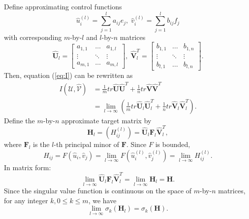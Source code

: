 \documentclass[12pt,onecolumn,draftcls]{IEEEtran}
\begin{document}
Define approximating control functions
\begin{equation}
\hat{u}_i^{(l)}=\sum_{j=1}^l a_{ij}e_j, \; \hat{v}_i^{(l)}=\sum_{j=1}^l b_{ij}f_j
\end{equation}
with corresponding $m$-by-$l$ and $l$-by-$n$ matrices
\begin{equation}
\mathbf{\hat{U}}_l=
\left[ 
\begin{array}{lll}
a_{1,1} & \ldots & a_{1,l} \\
\vdots & \ddots & \vdots \\
a_{m,1} & \ldots  & a_{m,l}
\end{array}
\right], \;
\mathbf{\hat{V}}_l^T=
\left[
\begin{array}{lll}
b_{1,1} & \ldots & b_{1,n} \\
\vdots & \ddots & \vdots \\
b_{l,1} & \ldots  & b_{l,n}
\end{array}
\right].
\end{equation}
Then, equation (\ref{eq:I}) can be rewritten as
\begin{align}
I(\mathcal{\hat{U}},\mathcal{\hat{V}})&= \frac{1}{m} tr \mathbf{\hat{U}} \mathbf{\hat{U}}^T +
\frac{1}{n}tr \mathbf{\hat{V}} \mathbf{\hat{V}}^T\\
&=
\lim_{l\rightarrow \infty} \left(
\frac{1}{m} tr \mathbf{\hat{U}}_l \mathbf{\hat{U}}_l^T +
\frac{1}{n} tr \mathbf{\hat{V}}_l \mathbf{\hat{V}}_l^T \right).
\end{align}
Define the $m$-by-$n$ approximate target matrix by
\begin{equation}
\mathbf{H}_l=\left( H_{ij}^{(l)} \right) = \mathbf{\hat{U}}_l \mathbf{F}_l \mathbf{\hat{V}}_l^T,
\end{equation}
where $\mathbf{F}_l$ is the $l$-th principal minor of $\mathbf{F}$.  Since $F$ is bounded, 
\begin{equation}
H_{ij}=F( \hat{u}_i, \hat{v}_j)=\lim_{l \rightarrow \infty} F(\hat{u}_i^{(l)},\hat{v}_j^{(l)})
=\lim_{l \rightarrow \infty}  H_{ij}^{(l)}.
\end{equation}
In matrix form:
\begin{equation}
\lim_{l \rightarrow \infty}  \mathbf{\hat{U}}_l \mathbf{F}_l \mathbf{\hat{V}}_l^T
=\lim_{l \rightarrow \infty} \mathbf{H}_l
=\mathbf{H}.
\label{eq:Hlimit}
\end{equation}
Since the singular value function is continuous on the space of $m$-by-$n$ matrices, for any integer $k, 0 \leq k \leq m$,
we have
\begin{equation}
\lim_{l \rightarrow \infty} \sigma_k(\mathbf{H}_l)= \sigma_k(\mathbf{H}).
\label{eq:singular}
\end{equation}
\end{document}
